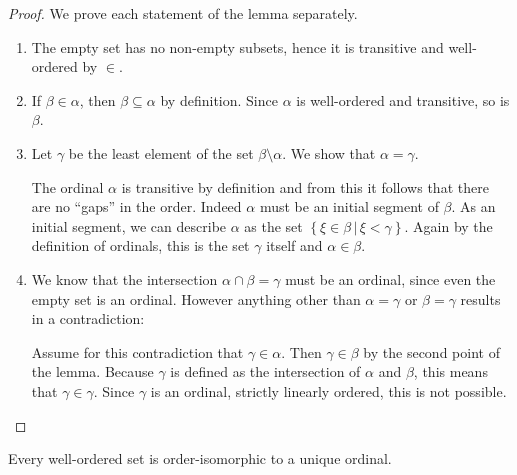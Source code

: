 \documentclass[../../main.tex]{subfiles}
\begin{document}
\begin{proof}
    We prove each statement of the lemma separately.
    \begin{enumerate}
        \item The empty set has no non-empty subsets, hence it is transitive and well-ordered by $\in$.
        \item If $\beta \in \alpha$, then $\beta \subseteq \alpha$ by definition. Since $\alpha$ is well-ordered and transitive, so is $\beta$.
        \item Let $\gamma$ be the least element of the set $\beta \setminus \alpha$. We show that $\alpha = \gamma$.
        
        The ordinal $\alpha$ is transitive by definition and from this it follows that there are no ``gaps'' in the order. Indeed $\alpha$ must be an initial segment of $\beta$.
        As an initial segment, we can describe $\alpha$ as the set $\left\{\xi \in \beta \,\vert\, \xi < \gamma\right\}$.
        Again by the definition of ordinals, this is the set $\gamma$ itself and $\alpha \in \beta$.
        \item We know that the intersection $\alpha \cap \beta = \gamma$ must be an ordinal, since even the empty set is an ordinal.
        However anything other than $\alpha = \gamma$ or $\beta = \gamma$ results in a contradiction:
        
        Assume for this contradiction that $\gamma \in \alpha$. Then $\gamma \in \beta$ by the second point of the lemma. 
        Because $\gamma$ is defined as the intersection of $\alpha$ and $\beta$, this means that $\gamma \in \gamma$.
        Since $\gamma$ is an ordinal, strictly linearly ordered, this is not possible. \qedhere
    \end{enumerate}
\end{proof}
 
\begin{theorem}\label{unique-ordinal}\cite[Theorem 2]{Jec78}
    Every well-ordered set is order-isomorphic to a unique ordinal.
\end{theorem}
\end{document}
